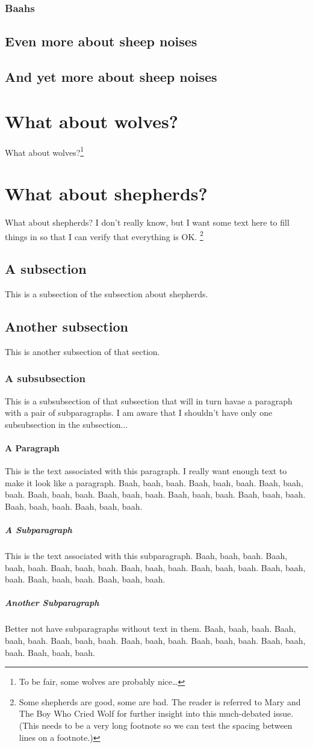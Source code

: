 \documentclass[proposal]{umassthesis}          %
\begin{document}
\subsubsection{Baahs}
\subsection{Even more about sheep noises}
\subsection{And yet more about sheep noises}

\section{What about wolves?}
What about wolves?\footnote{To be fair, some wolves are probably nice\ldots}

\section{What about shepherds?}
What about shepherds?  I don't really know, but I want some text here
to fill things in so that I can verify that everything is OK.%
\footnote{Some shepherds are good, some are bad. The reader is referred
  to Mary and The Boy Who Cried Wolf for further insight into this
  much-debated issue. (This needs to be a very long footnote so we can
  test the spacing between lines on a footnote.)}
\subsection{A subsection}
This is a subsection of the subsection about shepherds.
\subsection{Another subsection}
This is another subsection of that section.
\subsubsection{A subsubsection}
This is a subsubsection of that subsection that will in turn havae a
paragraph with a pair of subparagraphs.  I am aware that I shouldn't
have only one subsubsection in the subsection...
\paragraph{A Paragraph} 
This is the text associated with this paragraph.  I really want enough
text to make it look like a paragraph.  Baah, baah, baah.  Baah, baah,
baah.  Baah, baah, baah.  Baah, baah, baah.  Baah, baah, baah.  Baah,
baah, baah.  Baah, baah, baah.  Baah, baah, baah.  Baah, baah, baah. 
\subparagraph{A Subparagraph} 
This is the text associated with this subparagraph.  Baah, baah, baah.
Baah, baah, baah.  Baah, baah, baah.  Baah, baah, baah.  Baah, baah,
baah.  Baah, baah, baah.  Baah, baah, baah.  Baah, baah, baah. 
\subparagraph{Another Subparagraph}
Better not have subparagraphs without text in them.  Baah, baah, baah.
Baah, baah, baah.  Baah, baah, baah.  Baah, baah, baah.  Baah, baah,
baah.  Baah, baah, baah.  Baah, baah, baah. 
\end{document}
